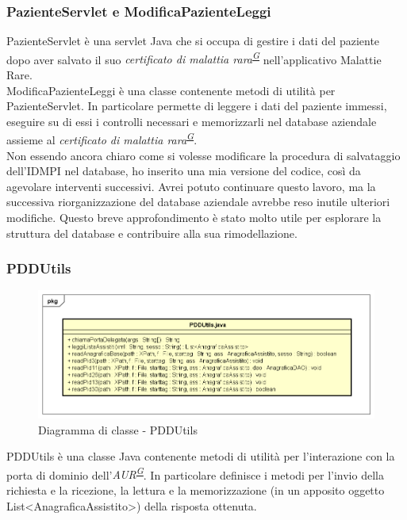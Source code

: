 \documentclass[a4paper]{article}
\begin{document}
\subsubsection{PazienteServlet e ModificaPazienteLeggi}
PazienteServlet è una servlet Java che si occupa di gestire i dati del paziente dopo aver salvato il suo \textit{certificato di malattia rara\textsuperscript{\hyperref[sec:gl]{G}}} nell'applicativo Malattie Rare.
\\
ModificaPazienteLeggi è una classe contenente metodi di utilità per PazienteServlet. In particolare permette di leggere i dati del paziente immessi, eseguire su di essi i controlli necessari e memorizzarli nel database aziendale assieme al \textit{certificato di malattia rara\textsuperscript{\hyperref[sec:gl]{G}}}. 
\\
Non essendo ancora chiaro come si volesse modificare la procedura di salvataggio dell'IDMPI nel database, ho inserito una mia versione del codice, così da agevolare interventi successivi. Avrei potuto continuare questo lavoro, ma la successiva riorganizzazione del database aziendale avrebbe reso inutile ulteriori modifiche. Questo breve approfondimento è stato molto utile per esplorare la struttura del database e contribuire alla sua rimodellazione.

\subsubsection{PDDUtils}
\begin{figure}[H]
	\centering
	\includegraphics[width=\linewidth]{uml/pddutils.png}
	\caption{Diagramma di classe - PDDUtils}
\end{figure}
PDDUtils è una classe Java contenente metodi di utilità per l'interazione con la porta di dominio dell'\textit{AUR\textsuperscript{\hyperref[sec:gl]{G}}}. In particolare definisce i metodi per l'invio della richiesta e la ricezione, la lettura e la memorizzazione (in un apposito oggetto List<AnagraficaAssistito>) della risposta ottenuta.
\end{document}
